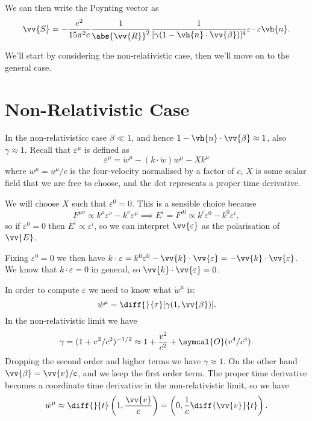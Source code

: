 \documentclass[fleqn]{NotesClass}
\newcommand*{\order}{\symcal{O}}
\begin{document}
    We can then write the Poynting vector as 
    \begin{equation}
        \vv{S} = -\frac{e^2}{15\pi^2 c} \frac{1}{\abs{\vv{R}}^2} \frac{1}{[\gamma(1 - \vh{n} \cdot \vv{\beta})]^4} \varepsilon \cdot \varepsilon \vh{n}.
    \end{equation}
    
    We'll start by considering the non-relativistic case, then we'll move on to the general case.
    
    \section{Non-Relativistic Case}
    In the non-relativisticc case \(\beta \ll 1\), and hence \(1 - \vh{n} \cdot \vv{\beta} \approx 1\), also \(\gamma \approx 1\).
    Recall that \(\varepsilon^\mu\) is defined as
    \begin{equation}
        \varepsilon^\mu = \dot{w}^\mu - (k \cdot \dot{w}) w^\mu - Xk^\mu
    \end{equation}
    where \(w^\mu = u^\mu/c\) is the four-velocity normalised by a factor of \(c\), \(X\) is some scalar field that we are free to choose, and the dot represents a proper time derivative.
    
    We will choose \(X\) such that \(\varepsilon^0 = 0\).
    This is a sensible choice because 
    \begin{equation}
        F^{\mu\nu} \propto k^\mu \varepsilon^\nu - k^\nu\varepsilon^\mu \implies E^i = F^{i0} \propto k^i\varepsilon^0 - k^0\varepsilon^i,
    \end{equation}
    so if \(\varepsilon^0 = 0\) then \(E^i \propto \varepsilon^i\), so we can interpret \(\vv{\varepsilon}\) as the polarisation of \(\vv{E}\).
    
    Fixing \(\varepsilon^0 = 0\) we then have \(k \cdot \varepsilon = k^0\varepsilon^0 - \vv{k} \cdot \vv{\varepsilon} = -\vv{k} \cdot \vv{\varepsilon}\).
    We know that \(k \cdot \varepsilon = 0\) in general, so \(\vv{k} \cdot \vv{\varepsilon} = 0\).
    
    In order to compute \(\varepsilon\) we need to know what \(\dot{w}^\mu\) is:
    \begin{equation}
        \dot{w}^\mu = \diff{}{\tau} [\gamma(1, \vv{\beta})].
    \end{equation}
    In the non-relativistic limit we have
    \begin{equation}
        \gamma = (1 + v^2/c^2)^{-1/2} \approx 1 + \frac{v^2}{c^2} + \order(v^4/c^4).
    \end{equation}
    Dropping the second order and higher terms we have \(\gamma \approx 1\).
    On the other hand \(\vv{\beta} = \vv{v}/c\), and we keep the first order term.
    The proper time derivative becomes a coordinate time derivative in the non-relativistic limit, so we have
    \begin{equation}
        \dot{w}^\mu \approx \diff{}{t} \left( 1, \frac{\vv{v}}{c} \right) = \left( 0, \frac{1}{c}\diff{\vv{v}}{t} \right).
    \end{equation}
    
\end{document}
